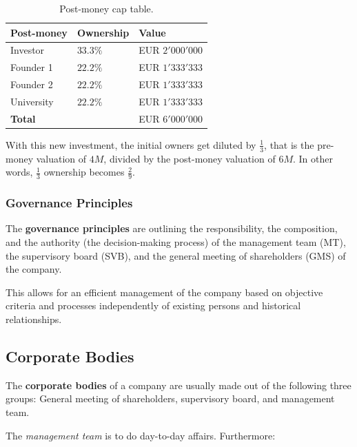 \documentclass[a4paper]{extarticle}
\begin{document}
 \begin{table}[H]
    \centering
    \begin{tabular}{|l|l|l|}
    \hline
    \textbf{Post-money} & \textbf{Ownership} & \textbf{Value}  \\ \hline
    Investor           & $33.3\%$           & EUR $2'000'000$ \\ \hline
    Founder 1          & $22.2\%$           & EUR $1'333'333$ \\ \hline
    Founder 2          & $22.2\%$           & EUR $1'333'333$ \\ \hline
    University         & $22.2\%$           & EUR $1'333'333$ \\ \hline
    \textbf{Total}     &                    & EUR $6'000'000$ \\ \hline
    \end{tabular}
    \caption{Post-money cap table.}
    \label{tab:cap-table-01-post-money}
\end{table}

With this new investment, the initial owners get diluted by \(\frac{1}{3}\), that is the pre-money valuation of \(4M\), divided by the post-money valuation of \(6M\). In other words, \(\frac{1}{3}\) ownership becomes \(\frac{2}{9}\).

\subsubsection{Governance Principles}

The \textbf{governance principles} are outlining the responsibility, the composition, and the authority (the decision-making process) of the management team (MT), the supervisory board (SVB), and the general meeting of shareholders (GMS) of the company.

This allows for an efficient management of the company based on objective criteria and processes independently of existing persons and historical relationships.

\subsection{Corporate Bodies}

The \textbf{corporate bodies} of a company are usually made out of the following three groups: General meeting of shareholders, supervisory board, and management team.

The \textit{management team} is to do day-to-day affairs. Furthermore:
\end{document}
